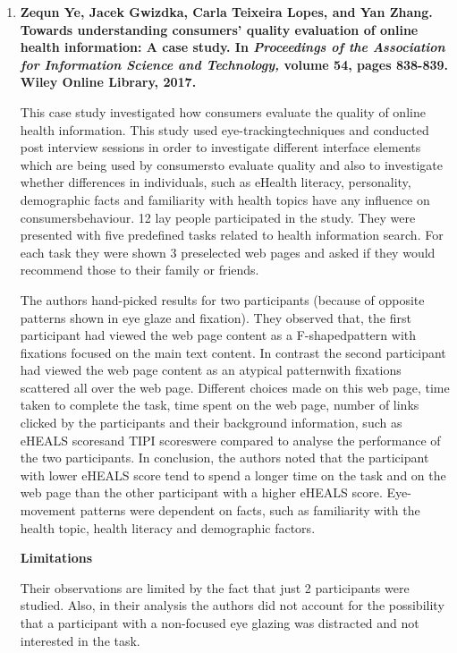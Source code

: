 \documentclass[]{article}
\begin{document}
\begin{enumerate}
\item {\textbf{Zequn Ye, Jacek Gwizdka, Carla Teixeira Lopes, and Yan Zhang. Towards understanding consumers’ quality evaluation of online health information: A case study. In \textit{Proceedings of the Association for Information Science and Technology,} volume 54, pages 838-839. Wiley Online Library, 2017.}}

This case study investigated how consumers evaluate the quality of online health information. This study used \textquotesingle eye-tracking\textquotesingle techniques and conducted post interview sessions in order to investigate different interface elements which are being used by consumers\textquotesingle to evaluate quality and also to investigate whether differences in individuals, such as eHealth literacy, personality, demographic facts and familiarity with health topics have any influence on consumers\textquotesingle behaviour. 12 lay people participated in the study. They were presented with five predefined tasks related to health information search. For each task they were shown 3 preselected web pages and asked if they would recommend those to their family or friends. 

The authors hand-picked results for two participants (because of opposite patterns shown in eye glaze and fixation). They observed that, the first participant had viewed the web page content as a \textquotesingle F-shaped\textquotesingle pattern with fixations focused on the main text content. In contrast the second participant had viewed the web page content as an \textquotesingle atypical pattern\textquotesingle with fixations scattered all over the web page. Different choices made on this web page, time taken to complete the task, time spent on the web page, number of links clicked by the participants and their background information, such as \textquotesingle eHEALS scores\textquotesingle and \textquotesingle TIPI scores\textquotesingle were compared to analyse the performance of the two participants. In conclusion, the authors noted that the participant with lower eHEALS score tend to spend a longer time on the task and on the web page than the other participant with a higher eHEALS score. Eye-movement patterns were dependent on facts, such as familiarity with the health topic, health literacy and demographic factors.               

\textbf{Limitations}

Their observations are limited by the fact that just 2 participants were studied. Also, in their analysis the authors did not account for the possibility that a participant with a non-focused eye glazing was distracted and not interested in the task. \\


\end{enumerate}
\end{document}
